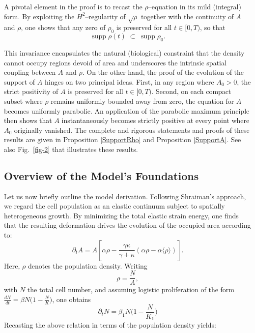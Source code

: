 \documentclass[12pt]{amsart}
\begin{document}
A pivotal element in the proof is to recast the $\rho$–equation in its mild (integral) form. By exploiting the $H^2$–regularity of $\sqrt{\rho}$ together with the continuity of $A$ and $\rho$, one shows that any zero of $\rho_0$ is preserved for all $t\in[0,T)$, so that 
\[
\operatorname{supp}\rho(t)\;\subset\;\operatorname{supp}\rho_0.
\]

This invariance encapsulates the natural (biological) constraint that the density cannot occupy regions devoid of area and underscores the intrinsic spatial coupling between $A$ and $\rho$. 
On the other hand, the proof of the evolution of the support of $A$ hinges on two principal ideas. First, in any region where $A_0>0$, the strict positivity of $A$ is preserved for all $t\in[0,T)$. Second, on each compact subset where $\rho$ remains uniformly bounded away from zero, the equation for $A$ becomes uniformly parabolic. An application of the parabolic maximum principle then shows that $A$ instantaneously becomes strictly positive at every point where $A_0$ originally vanished.
The complete and rigorous statements and proofs of these results are given in Proposition \ref{SupportRho} and Proposition \ref{SupportA}. See also Fig.~\ref{fig-2} that illustrates these results.

\subsection{Overview of the Model’s Foundations}

Let us now briefly outline the model derivation. Following Shraiman's approach, we regard the cell population as an elastic continuum subject to spatially heterogeneous growth. By minimizing the total elastic strain energy, one finds that the resulting deformation drives the evolution of the occupied area according to:
\[
\partial_t A = A \left[\alpha\rho-\frac{\gamma\kappa}{\gamma+\kappa}(\alpha\rho-\alpha\langle\rho\rangle)\right] .
\]
Here, $\rho$ denotes the population density. Writing 
\[
\rho = \frac{N}{A},
\]
with $N$ the total cell number, and assuming logistic proliferation of the form 
$\tfrac{dN}{dt}=\beta N\bigl(1-\tfrac{N}{K}\bigr)$,
one obtains
\[
\partial_t N = \beta_1 N\Big(1-\frac{N}{K_1}\Big)
\]
Recasting the above relation in terms of the population density yields:
\end{document}

